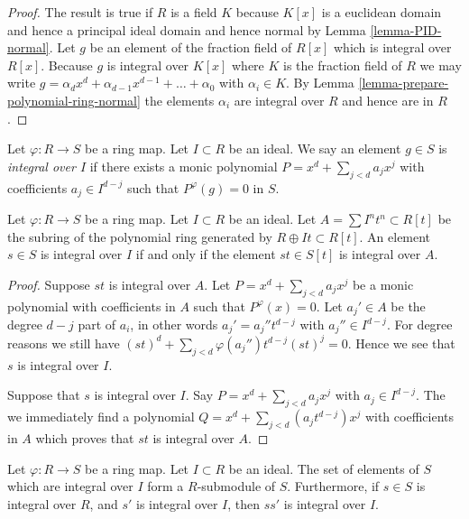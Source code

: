 \begin{proof}
The result is true if $R$ is a field $K$ because
$K[x]$ is a euclidean domain and hence a principal ideal
domain and hence normal by Lemma \ref{lemma-PID-normal}.
Let $g$ be an element of the fraction field of
$R[x]$ which is integral over $R[x]$. Because $g$
is integral over $K[x]$ where $K$ is the fraction
field of $R$ we may write $g = \alpha_d x^d + \alpha_{d-1}x^{d-1} + 
\ldots + \alpha_0$ with $\alpha_i \in K$.
By Lemma \ref{lemma-prepare-polynomial-ring-normal}
the elements $\alpha_i$ are integral over $R$ and
hence are in $R$.
\end{proof}

\begin{definition}
\label{definition-integral-over-ideal}
Let $\varphi : R\to S$ be a ring map.
Let $I \subset R$ be an ideal.
We say an element $g \in S$ is 
{\it integral over $I$} if
there exists a monic
polynomial $P = x^d + \sum_{j < d} a_j x^j$
with coefficients $a_j \in I^{d-j}$ such
that $P^\varphi(g) = 0$ in $S$.
\end{definition}

\begin{lemma}
\label{lemma-characterize-integral-ideal}
Let $\varphi : R \to S$ be a ring map.
Let $I \subset R$ be an ideal.
Let $A = \sum I^nt^n \subset R[t]$ be the
subring of the polynomial ring
generated by $R \oplus It \subset R[t]$.
An element $s \in S$ is integral over $I$ if
and only if the element $st \in S[t]$
is integral over $A$.
\end{lemma}

\begin{proof}
Suppose $st$ is integral over $A$.
Let $P = x^d + \sum_{j < d} a_j x^j$
be a monic polynomial with coefficients in $A$
such that $P^\varphi(x) = 0$. Let $a_j' \in A$
be the degree $d-j$ part of $a_i$, in other
words $a_j' = a_j'' t^{d-j}$ with $a_j'' \in I^{d-j}$.
For degree reasons we still have
$(st)^d + \sum_{j < d} \varphi(a_j'') t^{d-j} (st)^j = 0$.
Hence we see that $s$ is integral over $I$.

\medskip\noindent
Suppose that $s$ is integral over $I$.
Say $P = x^d + \sum_{j < d} a_j x^j$
with $a_j \in I^{d-j}$. The we immediately find a
polynomial $Q = x^d + \sum_{j < d} (a_j t^{d-j}) x^j$
with coefficients in $A$ which proves that
$st$ is integral over $A$.
\end{proof}

\begin{lemma}
\label{lemma-integral-over-ideal-is-submodule}
Let $\varphi : R \to S$ be a ring map.
Let $I \subset R$ be an ideal.
The set of elements of $S$ which are integral
over $I$ form a $R$-submodule of $S$.
Furthermore, if $s \in S$ is integral over
$R$, and $s'$ is integral over $I$, then
$ss'$ is integral over $I$.
\end{lemma}

